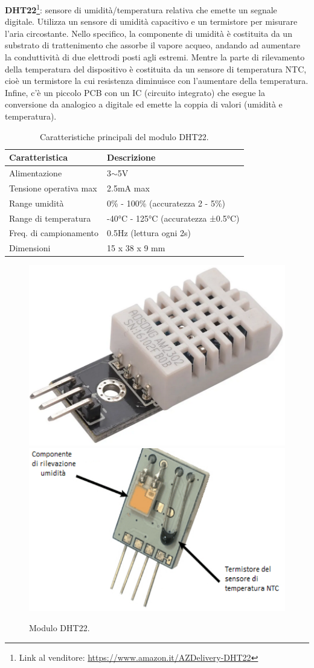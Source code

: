 \textbf{DHT22}\footnote{Link al venditore: \href{https://www.amazon.it/AZDelivery-temperatura-circuito-Raspberry-gratuito/dp/B078SVZB1X/ref=sr_1_6?keywords=dht22&qid=1673890614&sr=8-6&th=1}{https://www.amazon.it/AZDelivery-DHT22}}: sensore di umidità/temperatura relativa che emette un segnale digitale. Utilizza un sensore di umidità capacitivo e un termistore per misurare l'aria circostante. Nello specifico, la componente di umidità è costituita da un substrato di trattenimento che assorbe il vapore acqueo, andando ad aumentare la conduttività di due elettrodi posti agli estremi. Mentre la parte di rilevamento della temperatura del dispositivo è costituita da un sensore di temperatura NTC, cioè un termistore la cui resistenza diminuisce con l'aumentare della temperatura. Infine, c'è un piccolo PCB con un IC (circuito integrato) che esegue la conversione da analogico a digitale ed emette la coppia di valori (umidità e temperatura).

\begin{table}[H]
    \centering
    \begin{tabular}{|l|l|}
    \hline
    \textbf{Caratteristica} & \textbf{Descrizione}               \\ \hline
    Alimentazione           & 3$\sim$5V                          \\ \hline
    Tensione operativa max  & 2.5mA max                          \\ \hline
    Range umidità           & 0\% - 100\%  (accuratezza 2 - 5\%) \\ \hline
    Range di temperatura    & -40°C - 125°C (accuratezza ±0.5°C) \\ \hline
    Freq. di campionamento  & 0.5Hz (lettura ogni 2s)            \\ \hline
    Dimensioni              & 15 x 38 x 9 mm                     \\ \hline
    \end{tabular}
    \caption{\label{DHT22-features}Caratteristiche principali del modulo DHT22.}
\end{table}

\begin{figure}[H]
    \includegraphics[width=.35\textwidth]{images/sensors/dht22-a.png}\hfill
    \includegraphics[width=.35\textwidth]{images/sensors/dht22-b.png}\hfill
    \caption{Modulo DHT22.}
\end{figure}

